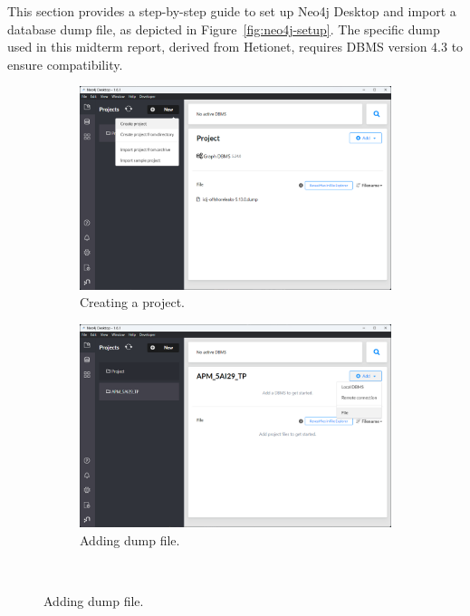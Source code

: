 This section provides a step-by-step guide to set up Neo4j Desktop and import a database dump file, as depicted in Figure~\ref{fig:neo4j-setup}. The specific dump used in this midterm report, derived from Hetionet, requires DBMS version $4.3$ to ensure compatibility.

\begin{figure}
    \centering
    \begin{subfigure}[b]{0.49\textwidth}
        \centering
        \includegraphics[width=\textwidth]{images/neo4j-setup/1}
        \caption{Creating a project.}
    \end{subfigure}
    \hfill
    \begin{subfigure}[b]{0.49\textwidth}
        \centering
        \includegraphics[width=\textwidth]{images/neo4j-setup/2}
        \caption{Adding dump file.}
    \end{subfigure}
    \\

\end{figure}
